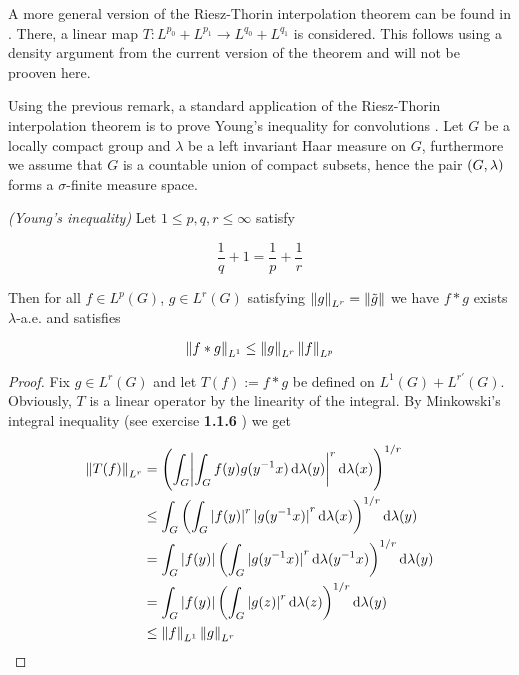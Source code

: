 \begin{remark}
	A more general version of the Riesz-Thorin interpolation theorem can be found in \textup{\cite[200--202]{folland:real_analysis:1999}}. There, a linear map $T: L^{p_0} + L^{p_1} \rightarrow L^{q_0} + L^{q_1}$ is considered. This follows using a density argument from the current version of the theorem and will not be prooven here.
	\label{rem:extension}
\end{remark}

\begin{remark}
	Using the previous remark, a standard application of the Riesz-Thorin interpolation theorem is to prove Young's inequality for convolutions \textup{\cite[22--23]{grafakos:fourier:2014}}. Let $G$ be a locally compact group and $\lambda$ be a left invariant Haar measure on $G$, furthermore we assume that $G$ is a countable union of compact subsets, hence the pair $\del{ G,\lambda }$ forms a $\sigma$-finite measure space.

\begin{theorem*}\emph{(Young's inequality)}
	Let $1 \leq p,q,r \leq \infty$ satisfy

	\begin{equation}
		\frac{1}{q} + 1 = \frac{1}{p} + \frac{1}{r}
		\label{hyp:young}
	\end{equation}

	Then for all $f \in L^p(G)$, $g \in L^r( G )$
	satisfying $\norm[0]{g}_{L^r} = \norm[0]{\tilde{g}}$ we have $f \ast g$ exists $\lambda$-a.e. and satisfies

	\begin{equation*}
		\norm[0]{f \ast g}_{L^1} \leq \norm[0]{g}_{L^r} \norm[0]{f}_{L^p}
	\end{equation*}
\end{theorem*}
	
\begin{proof}
	Fix $g \in L^r( G )$ and let $T(f) := f \ast g$ be defined on $L^1( G ) + L^{r'}( G )$. Obviously, $T$ is a linear operator by the linearity of the integral. By Minkowski's integral inequality (see exercise \textbf{1.1.6} \cite[13]{grafakos:fourier:2014}) we get

	\begin{equation*}
		\begin{aligned}
			\norm[0]{T(f)}_{L^r} &= \del{\int_G \abs{ \int_G f(y)g(y^{-1}x) \d\lambda(y)}^r \d\lambda(x)}^{1/r}\\
			&\leq \int_G \del{ \int_G \abs[0]{ f(y) }^r \abs[0]{ g(y^{-1}x) }^r \d\lambda(x)}^{1/r} \d\lambda(y)\\
			&= \int_G \abs[0]{ f(y)} \del{ \int_G \abs[0]{ g(y^{-1}x)}^r \d\lambda(y^{-1}x) }^{1/r} \d\lambda(y)\\
			&= \int_G \abs[0]{ f(y) } \del{ \int_G \abs[0]{ g(z) }^r \d\lambda(z) }^{1/r} \d\lambda(y)\\
			&\leq \norm[0]{f}_{L^1} \norm[0]{g}_{L^r}
		\end{aligned} 
	\end{equation*}


\end{proof}
\end{remark}
